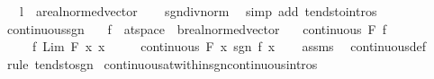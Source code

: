 \begin{isabellebody}
\ \ \ l\ {\isacharcolon}{\kern0pt}{\isacharcolon}{\kern0pt}\ {\isachardoublequoteopen}{\isacharprime}{\kern0pt}a{\isacharcolon}{\kern0pt}{\isacharcolon}{\kern0pt}real{\isacharunderscore}{\kern0pt}normed{\isacharunderscore}{\kern0pt}vector{\isachardoublequoteclose}\isanewline
%
\isadelimproof
\ \ %
\endisadelimproof
%
\isatagproof
{}\isamarkupfalse%
\ sgn{\isacharunderscore}{\kern0pt}div{\isacharunderscore}{\kern0pt}norm\ \isamarkupfalse%
\ {\isacharparenleft}{\kern0pt}simp\ add{\isacharcolon}{\kern0pt}\ tendsto{\isacharunderscore}{\kern0pt}intros{\isacharparenright}{\kern0pt}%
\endisatagproof
{\isafoldproof}%
%
\isadelimproof
\isanewline
%
\endisadelimproof
\isanewline
{}\isamarkupfalse%
\ continuous{\isacharunderscore}{\kern0pt}sgn{\isacharcolon}{\kern0pt}\isanewline
\ \ \ f\ {\isacharcolon}{\kern0pt}{\isacharcolon}{\kern0pt}\ {\isachardoublequoteopen}{\isacharprime}{\kern0pt}a{\isacharcolon}{\kern0pt}{\isacharcolon}{\kern0pt}t{}{\isacharunderscore}{\kern0pt}space\ {\isasymRightarrow}\ {\isacharprime}{\kern0pt}b{\isacharcolon}{\kern0pt}{\isacharcolon}{\kern0pt}real{\isacharunderscore}{\kern0pt}normed{\isacharunderscore}{\kern0pt}vector{\isachardoublequoteclose}\isanewline
\ \ \ {\isachardoublequoteopen}continuous\ F\ f{\isachardoublequoteclose}\isanewline
\ \ \ \ \ {\isachardoublequoteopen}f\ {\isacharparenleft}{\kern0pt}Lim\ F\ {\isacharparenleft}{\kern0pt}{\isasymlambda}x{\isachardot}{\kern0pt}\ x{\isacharparenright}{\kern0pt}{\isacharparenright}{\kern0pt}\ {\isasymnoteq}\ {}{\isachardoublequoteclose}\isanewline
\ \ \ {\isachardoublequoteopen}continuous\ F\ {\isacharparenleft}{\kern0pt}{\isasymlambda}x{\isachardot}{\kern0pt}\ sgn\ {\isacharparenleft}{\kern0pt}f\ x{\isacharparenright}{\kern0pt}{\isacharparenright}{\kern0pt}{\isachardoublequoteclose}\isanewline
%
\isadelimproof
\ \ %
\endisadelimproof
%
\isatagproof
{}\isamarkupfalse%
\ assms\ \isamarkupfalse%
\ continuous{\isacharunderscore}{\kern0pt}def\ \isamarkupfalse%
\ {\isacharparenleft}{\kern0pt}rule\ tendsto{\isacharunderscore}{\kern0pt}sgn{\isacharparenright}{\kern0pt}%
\endisatagproof
{\isafoldproof}%
%
\isadelimproof
\isanewline
%
\endisadelimproof
\isanewline
{}\isamarkupfalse%
\ continuous{\isacharunderscore}{\kern0pt}at{\isacharunderscore}{\kern0pt}within{\isacharunderscore}{\kern0pt}sgn{\isacharbrackleft}{\kern0pt}continuous{\isacharunderscore}{\kern0pt}intros{\isacharbrackright}{\kern0pt}{\isacharcolon}{\kern0pt}\isanewline

\end{isabellebody}
